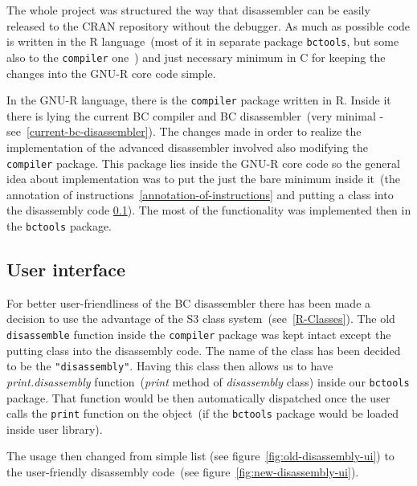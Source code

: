 \documentclass[thesis=M,english]{FITthesis}[2018/10/20]
\newcommand{\code}[1]{\texttt{#1}}
\begin{document}
The whole project was structured the way that disassembler can be easily released to the CRAN repository without the debugger. As much as possible code is written in the R language~(most of it in separate package \code{bctools}, but some also to the \code{compiler} one~\label{internal-parts-of-vm}) and just necessary minimum in C for keeping the changes into the GNU-R core code simple.

In the GNU-R language, there is the \code{compiler} package written in R. Inside it there is lying the current BC compiler and BC disassembler~(very minimal - see~\ref{current-bc-disassembler}). The changes made in order to realize the implementation of the advanced disassembler involved also modifying the \code{compiler} package. This package lies inside the GNU-R core code so the general idea about implementation was to put the just the bare minimum inside it~(the annotation of instructions~\ref{annotation-of-instructions} and putting a class into the disassembly code \ref{user-interface}). The most of the functionality was implemented then in the \code{bctools} package.

\subsection{User interface}\label{user-interface}

For better user-friendliness of the BC disassembler there has been made a decision to use the advantage of the S3 class system~(see~\ref{R-Classes}). The old \code{disassemble} function inside the \code{compiler} package was kept intact except the putting class into the disassembly code. The name of the class has been decided to be the \code{"disassembly"}. Having this class then allows us to have \textit{print.disassembly} function~(\textit{print} method of \textit{disassembly} class) inside our \code{bctools} package. That function would be then automatically dispatched once the user calls the \code{print} function on the object~(if the \code{bctools} package would be loaded inside user library).

The usage then changed from simple list (see figure~\ref{fig:old-disassembly-ui}) to the user-friendly disassembly code~(see figure~\ref{fig:new-disassembly-ui}).
\end{document}
